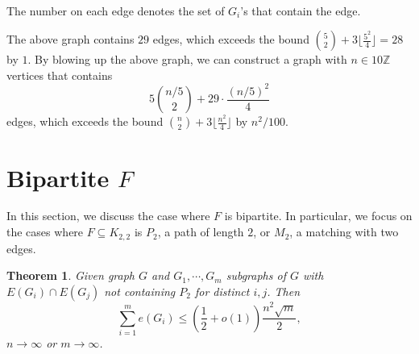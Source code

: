 \documentclass[12pt]{report}
\newtheorem{theorem}{Theorem}[chapter]
\begin{document}
\begin{center}
  \\
  \small{The number on each edge denotes the set of $G_i$'s that contain the edge.}
\end{center}
The above graph contains $29$ edges, which exceeds the bound $\binom{5}{2} + 3 \lfloor \frac{5^2}{4}
\rfloor = 28$ by $1$. By blowing up the above graph, we can construct a graph with $n \in
10\mathbb{Z}$ vertices that contains
\[
  5\binom{n/5}{2} + 29 \cdot \frac{(n/5)^2}{4}
\]
edges, which exceeds the bound $\binom{n}{2} + 3\lfloor\frac{n^2}{4}\rfloor$ by $n^2/100$. 

\section{Bipartite $F$}

In this section, we discuss the case where $F$ is bipartite. In particular, we focus on the cases
where $F \subseteq K_{2, 2}$ is $P_2$, a path of length $2$, or $M_2$, a matching with two edges.

\begin{theorem}
  Given graph $G$ and $G_1, \cdots, G_m$ subgraphs of $G$ with $E(G_i) \cap E(G_j)$ not containing
  $P_2$ for distinct $i, j$. Then
  \[
    \sum_{i = 1}^m e(G_i) \leq \left(\frac{1}{2} + o(1)\right)\frac{n^{2}\sqrt{m}}{2},
  \]
  $n \to \infty$ or $m \to \infty$.
\end{theorem}
\end{document}
